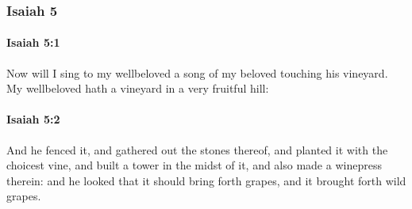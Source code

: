 	\subsubsection{Isaiah 5} %
		\label{ISAIAH-5}

		\paragraph{Isaiah 5:1} %
			\label{ISAIAH-5-1}

			Now will I sing to my wellbeloved a song of my beloved touching his vineyard. My wellbeloved hath a vineyard in a very fruitful hill:


		\paragraph{Isaiah 5:2} %
			\label{ISAIAH-5-2}

			And he fenced it, and gathered out the stones thereof, and planted it with the choicest vine, and built a tower in the midst of it, and also made a winepress therein: and he looked that it should bring forth grapes, and it brought forth wild grapes.

